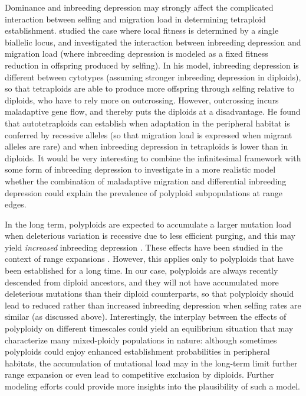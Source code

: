 \documentclass[12pt,a4paper]{article}
\begin{document}
Dominance and inbreeding depression may strongly affect the complicated
interaction between selfing and migration load in determining tetraploid
establishment.
\cite{griswold2021} studied the case where local fitness is determined by a
single biallelic locus, and investigated the interaction between inbreeding
depression and migration load (where inbreeding depression is modeled as a
fixed fitness reduction in offspring produced by selfing).
In his model, inbreeding depression is different between cytotypes (assuming
stronger inbreeding depression in diploids), so that tetraploids are able to
produce more offspring through selfing relative to diploids, who have to rely
more on outcrossing.
However, outcrossing incurs maladaptive gene flow, and thereby puts the
diploids at a disadvantage. 
He found that autotetraploids can establish when adaptation in the
peripheral habitat is conferred by recessive alleles (so that migration load is
expressed when migrant alleles are rare) and when inbreeding depression in
tetraploids is lower than in diploids.
It would be very interesting to combine the infinitesimal framework with some
form of inbreeding depression to investigate in a more realistic model whether
the combination of maladaptive migration and differential inbreeding depression
could explain the prevalence of polyploid subpopulations at range edges.

In the long term, polyploids are expected to accumulate a larger
mutation load when deleterious variation is recessive due to less efficient
purging, and this may yield \textit{increased} inbreeding depression
\citep{vlcek2025biorxiv}.
These effects have been studied in the context of range expansions
\citep{booker2024}.
However, this applies only to polyploids that have been established for a long
time.
In our case, polyploids are always recently descended from diploid ancestors,
and they will not have accumulated more deleterious mutations than their
diploid counterparts, so that polyploidy should lead to reduced rather than
increased inbreeding depression when selfing rates are similar (as discussed
above).
Interestingly, the interplay between the effects of polyploidy on different
timescales could yield an equilibrium situation that may characterize many
mixed-ploidy populations in nature: although sometimes polyploids could enjoy
enhanced establishment probabilities in peripheral habitats, the accumulation
of mutational load may in the long-term limit further range expansion or
even lead to competitive exclusion by diploids.
Further modeling efforts could provide more insights into the plausibility of
such a model.
\end{document}
